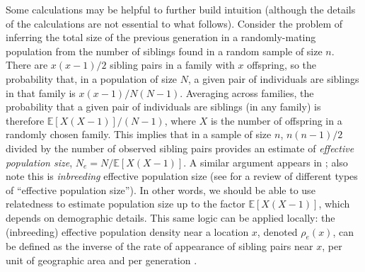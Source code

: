 \documentclass{ar-1col}
\renewcommand{\emph}[1]{{\textit{#1}}}
\newcommand{\E}{\mathbb{E}}
\newcommand{\details}[1]{}
\begin{document}
Some calculations may be helpful to further build intuition
(although the details of the calculations are not essential to what follows).
Consider the problem of inferring the total size of the previous generation
in a randomly-mating population
from the number of siblings found in a random sample of size $n$.
There are $x (x-1) / 2$ sibling pairs in a family with $x$ offspring,
so the probability that, 
in a population of size $N$, 
a given pair of individuals are siblings in that family is $x(x-1)/N(N-1)$.
Averaging across families, the probability that a given pair of individuals
are siblings (in any family)
is therefore $\E[X (X-1)] / (N-1)$, where $X$ is the number of offspring in a randomly chosen family.
This implies that in a sample of size $n$,
$n(n-1)/2$ divided by the number of observed sibling pairs 
provides an estimate of \emph{effective population size}, 
$N_e = N/\E[X(X-1)]$.
A similar argument appears in \citet{mohle2003cpd}; 
also note this is \emph{inbreeding} effective population size
(see \citet{wang2016prediction} for a review of different types of ``effective population size'').
In other words, we should be able to use relatedness to estimate population size
up to the factor $\E[X(X-1)]$, which depends on demographic details. 
This same logic can be applied locally:
the (inbreeding) effective population density
near a location $x$, denoted $\rho_e(x)$,
can be defined as the inverse of the rate of appearance of sibling pairs
near $x$, per unit of geographic area and per generation \citep{barton-depaulis-etheridge}.
\details{
    Let $P$ denote the probability that two diploids sampled from the population are siblings, and
    let $Q$be the probability that randomly sampled chromosomes from two randomly sampled diploids inherit from the same parental chromosome at a randomly chosen locus.
    Claim: Assuming monogamy (no half-sibs), $1/P$ is ``diploid inbreeding $N_e$'', 
    defined (in \citet{ewens2004mpg}) to be $1/(2Q)$.  
    (Note the caveats about diploidy do not appear in Ewens.)
    Proof: Under monogamy, the chance a random locus on random chromosomes from the two diploids are IBD from a common parent is $1/2$, so $Q = P/2$.
}
\end{document}
